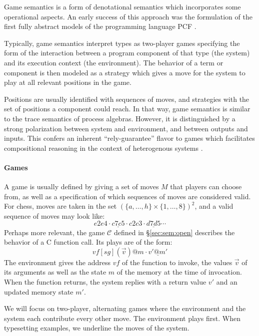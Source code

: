 \documentclass[sigplan,10pt,review,anonymous]{acmart}
\begin{document}
Game semantics is a form of denotational semantics which
incorporates some operational aspects.
An early success of this approach was
the formulation of the first fully abstract models
of the programming language PCF \cite{pcfajm,pcfho}.

Typically,
game semantics interpret
types as two-player games
specifying the form of the interaction
between a program component of that type
(the system)
and its execution context
(the environment).
The behavior of a term or component
is then modeled as a strategy
which gives a move for the system to play
at all relevant positions in the game.

Positions are usually identified with sequences of moves,
and strategies with the set of positions
a component could reach.
In that way,
game semantics is similar to
the trace semantics of process algebras.
However, it is distinguished
by a strong polarization between
system and environment,
and between outputs and inputs.
This confers an inherent ``rely-guarantee'' flavor
to games which facilitates compositional reasoning
in the context of heterogenous systems \cite{cspgs}.


\paragraph{Games} \label{sec:mainideas:gs:games} %

A game is usually defined by giving a set of moves $M$
that players can choose from,
as well as a specification of which
sequences of moves are considered valid.
For chess,
moves are taken in the set $(\{a, \ldots, h\} \times \{1, \ldots, 8\})^2$,
and a valid sequence of moves may look like:
\[ e2e4 \cdot \underline{c7c5} \cdot c2c3 \cdot \underline{d7d5} \cdots \]
Perhaps more relevant,
the game $\mathcal{C}$ defined in \S\ref{sec:sem:open}
describes the behavior of a C function call.
Its plays are of the form:
\[ \mathit{vf}[\mathit{sg}](\vec{v})@m \cdot \underline{v'@m'} \]
The environment gives the address $\mathit{vf}$
of the function to invoke,
the values $\vec{v}$ of its arguments
as well as the state $m$ of the memory
at the time of invocation.
When the function returns,
the system replies with
a return value $v'$
and an updated memory state $m'$.

We will focus on two-player, alternating games
where the environment and the system each contribute every other move.
The environment plays first.
When typesetting examples,
we underline the moves of the system.
\end{document}
